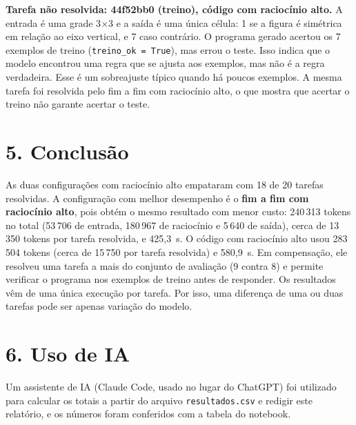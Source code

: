 \documentclass[11pt,a4paper]{article}
\begin{document}
\textbf{Tarefa não resolvida: 44f52bb0 (treino), código com raciocínio alto.} A entrada é uma grade
3$\times$3 e a saída é uma única célula: 1 se a figura é simétrica em relação ao eixo vertical, e 7 caso
contrário. O programa gerado acertou os 7 exemplos de treino (\texttt{treino\_ok = True}), mas errou o teste.
Isso indica que o modelo encontrou uma regra que se ajusta aos exemplos, mas não é a regra verdadeira.
Esse é um sobreajuste típico quando há poucos exemplos. A mesma tarefa foi resolvida pelo fim a fim com
raciocínio alto, o que mostra que acertar o treino não garante acertar o teste.

\section*{5. Conclusão}
As duas configurações com raciocínio alto empataram com 18 de 20 tarefas resolvidas. A configuração com
melhor desempenho é o \textbf{fim a fim com raciocínio alto}, pois obtém o mesmo resultado com menor custo:
240\,313 tokens no total (53\,706 de entrada, 180\,967 de raciocínio e 5\,640 de saída), cerca de
13\,350 tokens por tarefa resolvida, e 425,3~s. O código com raciocínio alto usou 283\,504 tokens
(cerca de 15\,750 por tarefa resolvida) e 580,9~s. Em compensação, ele resolveu uma tarefa a mais do
conjunto de avaliação (9 contra 8) e permite verificar o programa nos exemplos de treino antes de
responder. Os resultados vêm de uma única execução por tarefa. Por isso, uma diferença de uma ou
duas tarefas pode ser apenas variação do modelo.

\section*{6. Uso de IA}
Um assistente de IA (Claude Code, usado no lugar do ChatGPT) foi utilizado para calcular os totais a
partir do arquivo \texttt{resultados.csv} e redigir este relatório, e os números foram conferidos com a
tabela do notebook.
\end{document}
